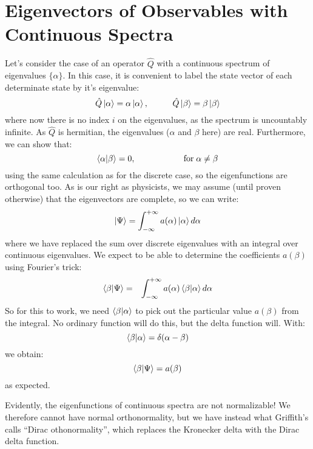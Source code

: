 \documentclass[12pt]{book}
\begin{document}
\section{Eigenvectors of Observables with Continuous Spectra}

Let's consider the case of an operator $\hat{Q}$ with a continuous spectrum of eigenvalues $\{\alpha\}$.  In this case, it is convenient to label the state vector of each determinate state by it's eigenvalue:
$$\hat{Q}\ket{\alpha} = \alpha \ket{\alpha}, \hspace{1cm} \hat{Q}\ket{\beta} = \beta \ket{\beta}$$
where now there is no index $i$ on the eigenvalues, as the spectrum is uncountably infinite.  As $\hat{Q}$ is hermitian, the eigenvalues ($\alpha$ and $\beta$ here) are real.  Furthermore, we can show that:
$$\braket{\alpha|\beta} = 0, \hspace{2cm} {\rm for} \;\alpha \neq \beta$$ 
using the same calculation as for the discrete case, so the eigenfunctions are orthogonal too.  As is our right as physicists, we may assume (until proven otherwise) that the eigenvectors are complete, so we can write:
$$\ket{\Psi} = \int_{-\infty}^{+\infty} a(\alpha) \ket{\alpha}d\alpha$$
where we have replaced the sum over discrete eigenvalues with an integral over continuous eigenvalues.
We expect to be able to determine the coefficients $a(\beta)$ using Fourier's trick:
\begin{eqnarray*}
\braket{\beta|\Psi} &=& \int_{-\infty}^{+\infty} a(\alpha) \braket{\beta | \alpha} d\alpha \\
\end{eqnarray*}
So for this to work, we need $\braket{\beta | \alpha}$ to pick out the particular value $a(\beta)$ from the integral.  No ordinary function will do this, but the delta function will.  With:
$$\braket{\beta|\alpha} = \delta(\alpha-\beta)$$
we obtain:
$$\braket{\beta|\Psi} = a(\beta)$$
as expected.

Evidently, the eigenfunctions of continuous spectra are not normalizable!  We therefore cannot have normal orthonormality, but we have instead what Griffith's calls ``Dirac othonormality'', which replaces the Kronecker delta with the Dirac delta function.\\ 
\end{document}

